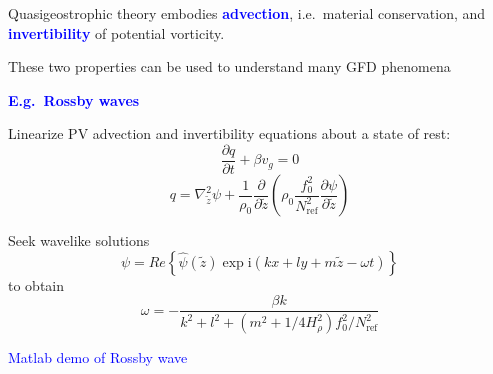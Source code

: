 \documentclass[a4]{seminar}
\newcommand{\ii}{\mathrm{i}}
\newcommand{\B}[1]{\textcolor{blue}{#1}}
\begin{document}



\begin{slide}

Quasigeostrophic theory embodies \B{\bf advection},
i.e.\ material conservation, and \B{\bf invertibility}
of potential vorticity.

\vspace{2mm}

These two properties can be used to understand many
GFD phenomena

\end{slide}


\begin{slide}

\B{\bf E.g.\ Rossby waves}

Linearize PV advection and invertibility equations about a state of rest:
\begin{displaymath}
\frac{\partial q}{\partial t} + \beta v_g = 0
\end{displaymath}
\begin{displaymath}
q = \nabla_{\tilde{z}}^2 \psi +
\frac{1}{\rho_0} \frac{\partial}{\partial \tilde{z}}
\left( \rho_0 \frac{f_0^2}{N^2_{\mathrm{ref}}} \frac{\partial \psi}{\partial \tilde{z}} \right) 
\end{displaymath}

Seek wavelike solutions
\begin{displaymath}
\psi = Re \left\{ \hat{\psi}(\tilde{z}) \exp \ii (kx + ly + m \tilde{z} - \omega t)\right\}
\end{displaymath}
to obtain
\begin{displaymath}
\omega = - \frac{\beta k}{k^2 + l^2 + (m^2 + 1/4H_\rho^2) f_0^2 / N^2_\mathrm{ref}}
\end{displaymath}


\end{slide}


\begin{slide}

\begin{center}
\B{Matlab demo of Rossby wave}
\end{center}

\end{slide}
\end{document}
